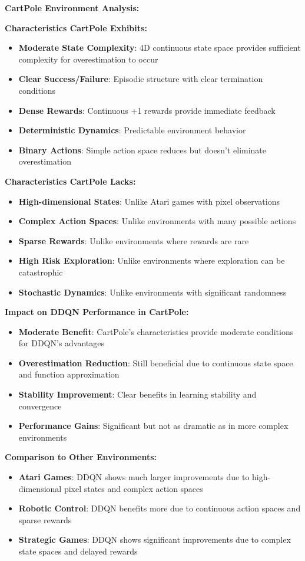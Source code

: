 \documentclass[12pt]{article}
\begin{document}
{{{\textbf{CartPole Environment Analysis:}

\textbf{Characteristics CartPole Exhibits:}
\begin{itemize}
    \item \textbf{Moderate State Complexity}: 4D continuous state space provides sufficient complexity for overestimation to occur
    \item \textbf{Clear Success/Failure}: Episodic structure with clear termination conditions
    \item \textbf{Dense Rewards}: Continuous +1 rewards provide immediate feedback
    \item \textbf{Deterministic Dynamics}: Predictable environment behavior
    \item \textbf{Binary Actions}: Simple action space reduces but doesn't eliminate overestimation
\end{itemize}

\textbf{Characteristics CartPole Lacks:}
\begin{itemize}
    \item \textbf{High-dimensional States}: Unlike Atari games with pixel observations
    \item \textbf{Complex Action Spaces}: Unlike environments with many possible actions
    \item \textbf{Sparse Rewards}: Unlike environments where rewards are rare
    \item \textbf{High Risk Exploration}: Unlike environments where exploration can be catastrophic
    \item \textbf{Stochastic Dynamics}: Unlike environments with significant randomness
\end{itemize}

\textbf{Impact on DDQN Performance in CartPole:}
\begin{itemize}
    \item \textbf{Moderate Benefit}: CartPole's characteristics provide moderate conditions for DDQN's advantages
    \item \textbf{Overestimation Reduction}: Still beneficial due to continuous state space and function approximation
    \item \textbf{Stability Improvement}: Clear benefits in learning stability and convergence
    \item \textbf{Performance Gains}: Significant but not as dramatic as in more complex environments
\end{itemize}

\textbf{Comparison to Other Environments:}
\begin{itemize}
    \item \textbf{Atari Games}: DDQN shows much larger improvements due to high-dimensional pixel states and complex action spaces
    \item \textbf{Robotic Control}: DDQN benefits more due to continuous action spaces and sparse rewards
    \item \textbf{Strategic Games}: DDQN shows significant improvements due to complex state spaces and delayed rewards
\end{itemize}

}}}
\end{document}
